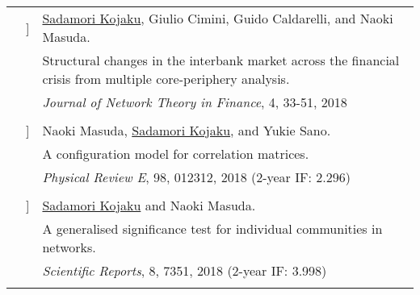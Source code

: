 \documentclass[letterpaper, 11pt]{article}
\newcounter{papercount}
\newcounter{papertype}
\newcommand{\paperitem}{%
\stepcounter{papercount}%
{\color{OliveGreen}{[\Alph{papertype}\thepapercount}]}
}
\begin{document}
\begin{longtable}{p{1.3in}p{2em}p{5.5in}}
                                                    &\paperitem &\underline{Sadamori Kojaku}, Giulio Cimini, Guido Caldarelli, and Naoki Masuda. \\
                                                    & &Structural changes in the interbank market across the financial crisis from multiple core-periphery analysis. \\
                                                    & &\textit{Journal of Network Theory in Finance}, 4, 33-51, 2018\\
                                                    &
                                                                                                                                                                                                                                                                              \\
                                                    &\paperitem & Naoki Masuda, \underline{Sadamori Kojaku}, and Yukie Sano. \\
                                                    & & A configuration model for correlation matrices. \\
                                                    & & \textit{Physical Review E}, 98, 012312, 2018 (2-year IF: 2.296)\\
                                                    &
                                                                                                                                                                                                                                                                              \\
                                                    &\paperitem & \underline{Sadamori Kojaku} and Naoki Masuda. \\
                                                    & &  A generalised significance test for individual communities in networks. \\
                                                    & & \textit{Scientific Reports}, 8, 7351, 2018 (2-year IF: 3.998)\\
                                                    &
                                                                                                                                                                                                                                                                              \\

\end{longtable}
\end{document}

